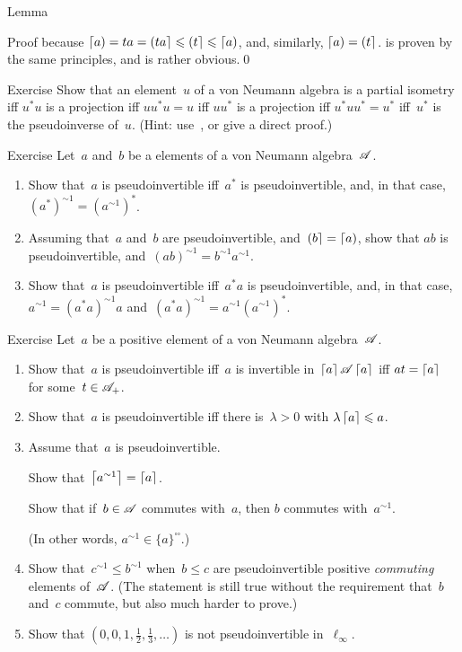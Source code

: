\documentclass[a]{subfiles}
\begin{document}
\begin{parsec}
\begin{point}{Lemma}
\begin{point}{Proof}
because $\left\lceil a\right)=ta=\left(ta\right\rceil\leqslant \left(t\right\rceil\leqslant \left\lceil a\right)$,
and, similarly, $\left\lceil a\right)=\left(t\right\rceil$.
\grayed{(\ref{pseudoinverse-4}$
	\Longrightarrow$%
\ref{pseudoinverse-5})}
is proven by the same principles, and
\grayed{(\ref{pseudoinverse-5}$
	\Longrightarrow$%
\ref{pseudoinverse-1},\ref{pseudoinverse-3})}
is rather obvious.\qed
\end{point}
\end{point}
\begin{point}{Exercise}%
Show that an element~$u$ of a von Neumann algebra
is a partial isometry iff
$u^*u$ is a projection
iff $uu^*u=u$
iff $uu^*$ is a projection
iff $u^*uu^*=u^*$
iff~$u^*$ is the pseudoinverse of~$u$.
(Hint: use~,
or give a direct proof.)
\end{point}
\begin{point}{Exercise}%
Let~$a$ and~$b$ be a elements of a von Neumann algebra~$\mathscr{A}$.
\begin{enumerate}
\item
Show that~$a$ is pseudoinvertible
iff~$a^*$ is pseudoinvertible,
and, in that case, $(a^*)^{\sim1}=(a^{\sim1})^*$.
\item
Assuming that~$a$ and~$b$ are pseudoinvertible,
and~$\left(b\right\rceil=\left\lceil a\right)$,
show that $ab$ is pseudoinvertible,
and~$(ab)^{\sim1}=b^{\sim1}a^{\sim1}$.


\item
Show that~$a$ is pseudoinvertible
iff~$a^*a$ is pseudoinvertible,
and, in that case, $a^{\sim 1} = (a^*a)^{\sim1}a$
and~$(a^*a)^{\sim1}=a^{\sim1}(a^{\sim1})^*$.
\end{enumerate}
\end{point}
\begin{point}{Exercise}%
Let~$a$ be a positive element of a von Neumann algebra~$\mathscr{A}$.
\begin{enumerate}
\item
Show that~$a$ is pseudoinvertible iff~$a$
is invertible in~$\left\lceil a\right\rceil\mathscr{A}\left\lceil a\right\rceil$
iff $at=\left\lceil a\right\rceil$ for some~$t\in\mathscr{A}_+$.
\item
Show that~$a$ is pseudoinvertible iff
there is~$\lambda>0$ with $\lambda \left\lceil a\right\rceil\leqslant a$.
\item
Assume that~$a$ is pseudoinvertible.

Show that~$\left\lceil a^{\sim1}\right\rceil=\left\lceil a\right\rceil$.

Show that if~$b\in \mathscr{A}$ commutes with~$a$,
then $b$ commutes with~$a^{\sim 1}$.

(In other words, $a^{\sim1}\in\{a\}^{\square\square}$.)
\item
Show that~$c^{\sim1}\leq b^{\sim1}$
when~$b\leq c$ are pseudoinvertible positive \emph{commuting}
elements of~$\mathscr{A}$.
(The statement is still true without
the requirement that~$b$ and~$c$ commute,
but also much harder to prove.)


\item
Show that $(0,0,1,\frac{1}{2}, \frac{1}{3},\dotsc)$
is not pseudoinvertible in~$\ell_\infty$.
\end{enumerate}
\end{point}
\end{parsec}
\end{document}
